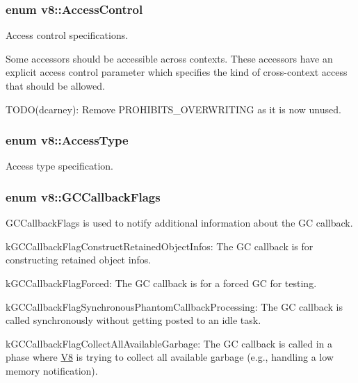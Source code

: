 \subsubsection[{\texorpdfstring{Access\+Control}{AccessControl}}]{\setlength{\rightskip}{0pt plus 5cm}enum {\bf v8\+::\+Access\+Control}}\hypertarget{namespacev8_a31d8355cb043d7d2dda3f4a52760b64e}{}\label{namespacev8_a31d8355cb043d7d2dda3f4a52760b64e}
Access control specifications.

Some accessors should be accessible across contexts. These accessors have an explicit access control parameter which specifies the kind of cross-\/context access that should be allowed.

T\+O\+D\+O(dcarney)\+: Remove P\+R\+O\+H\+I\+B\+I\+T\+S\+\_\+\+O\+V\+E\+R\+W\+R\+I\+T\+I\+NG as it is now unused. 
\subsubsection[{\texorpdfstring{Access\+Type}{AccessType}}]{\setlength{\rightskip}{0pt plus 5cm}enum {\bf v8\+::\+Access\+Type}}\hypertarget{namespacev8_add8bef6469c5b94706584124e610046c}{}\label{namespacev8_add8bef6469c5b94706584124e610046c}
Access type specification. 
\subsubsection[{\texorpdfstring{G\+C\+Callback\+Flags}{GCCallbackFlags}}]{\setlength{\rightskip}{0pt plus 5cm}enum {\bf v8\+::\+G\+C\+Callback\+Flags}}\hypertarget{namespacev8_a247c37a849f4d6c293b9b16e94e1944b}{}\label{namespacev8_a247c37a849f4d6c293b9b16e94e1944b}
G\+C\+Callback\+Flags is used to notify additional information about the GC callback.
\begin{DoxyItemize}
\item k\+G\+C\+Callback\+Flag\+Construct\+Retained\+Object\+Infos\+: The GC callback is for constructing retained object infos.
\item k\+G\+C\+Callback\+Flag\+Forced\+: The GC callback is for a forced GC for testing.
\item k\+G\+C\+Callback\+Flag\+Synchronous\+Phantom\+Callback\+Processing\+: The GC callback is called synchronously without getting posted to an idle task.
\item k\+G\+C\+Callback\+Flag\+Collect\+All\+Available\+Garbage\+: The GC callback is called in a phase where \hyperlink{classv8_1_1V8}{V8} is trying to collect all available garbage (e.\+g., handling a low memory notification). 
\end{DoxyItemize}
